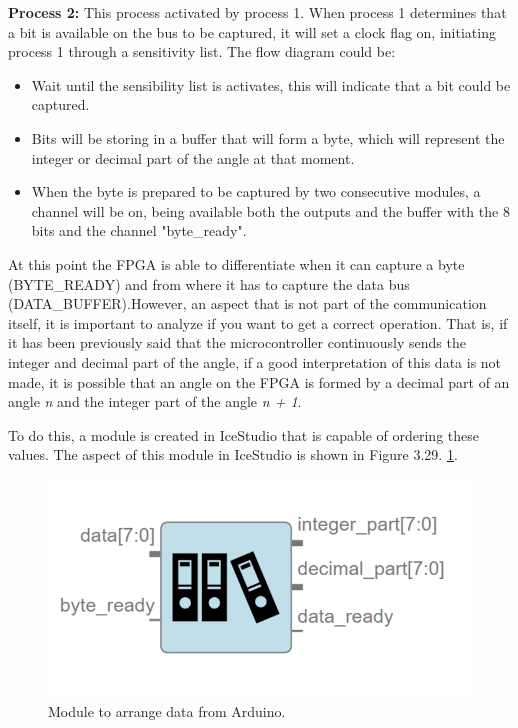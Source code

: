 \textbf{Process 2:} This process activated by process 1. When process 1 determines that a bit is available on the bus to be captured, it will set a clock flag on, initiating process 1 through a sensitivity list. The flow diagram could be:

\begin{itemize}
	\item Wait until the sensibility list is activates, this will indicate that a bit could be captured.
	\item Bits will be storing in a buffer that will form a byte, which will represent the integer or decimal part of the angle at that moment.
	\item When the byte is prepared to be captured by two consecutive modules, a channel will be on, being available both the outputs and the buffer with the 8 bits and the channel "byte\_ready".
\end{itemize}

At this point the FPGA is able to differentiate when it can capture a byte (BYTE\_READY) and from where it has to capture the data bus (DATA\_BUFFER).However, an aspect that is not part of the communication itself, it is important to analyze if you want to get a correct operation. That is, if it has been previously said that the microcontroller continuously sends the integer and decimal part of the angle, if a good interpretation of this data is not made, it is possible that an angle on the FPGA is formed by a decimal part of an angle \textit{n} and the integer part of the angle \textit{n + 1}.  \newline

To do this, a module is created in IceStudio that is capable of ordering these values. The aspect of this module in IceStudio is shown in Figure 3.29. \ref{fig:arrange_arduino}.

\begin{figure}[H]
	\center
	\includegraphics[scale=0.4]{imagenes/Balancing_robot/arrange_arduino.PNG}
	\caption{Module to arrange data from Arduino.}
	\label{fig:arrange_arduino}
\end{figure}

